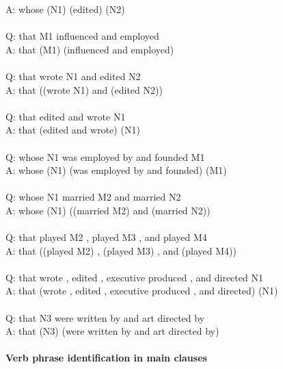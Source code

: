 \documentclass{article} \usepackage{iclr2022_conference,times}
\begin{document}
{A: whose (N1) (edited) (N2) \\
 \\
Q: that M1 influenced and employed \\
A: that (M1) (influenced and employed) \\
 \\
Q: that wrote N1 and edited N2 \\
A: that ((wrote N1) and (edited N2)) \\
 \\
Q: that edited and wrote N1 \\
A: that (edited and wrote) (N1) \\
 \\
Q: whose N1 was employed by and founded M1 \\
A: whose (N1) (was employed by and founded) (M1) \\
 \\
Q: whose N1 married M2 and married N2 \\
A: whose (N1) ((married M2) and (married N2)) \\
 \\
Q: that played M2 , played M3 , and played M4 \\
A: that ((played M2) , (played M3) , and (played M4)) \\
 \\
Q: that wrote , edited , executive produced , and directed N1 \\
A: that (wrote , edited , executive produced , and directed) (N1) \\
 \\
Q: that N3 were written by and art directed by \\
A: that (N3) (were written by and art directed by)}

\paragraph{Verb phrase identification in main clauses}
\end{document}
